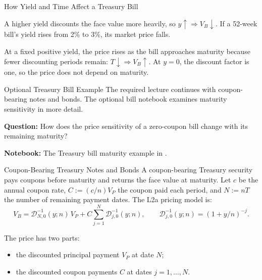 \documentclass[aspectratio=169,11pt]{beamer}
\begin{document}
\begin{frame}{How Yield and Time Affect a Treasury Bill}
  \vspace{0.4em}
  {\large\textbf{}}
  \vspace{0.2em}

  A higher yield discounts the face value more heavily, so
  $y\uparrow \Rightarrow V_B\downarrow$. If a 52-week bill's yield rises from
  2\% to 3\%, its market price falls.

  \vspace{0.9em}
  {\large\textbf{}}
  \vspace{0.2em}

  At a fixed positive yield, the price rises as the bill approaches maturity
  because fewer discounting periods remain: $T\downarrow \Rightarrow
  V_B\uparrow$. At $y=0$, the discount factor is one, so the price does not
  depend on maturity.

\end{frame}

\begin{frame}{Optional Treasury Bill Example}
  \vspace{0.6em}
  The required lecture continues with coupon-bearing notes and bonds. The
  optional bill notebook examines maturity sensitivity in more detail.

  \vspace{1.0em}
  {\normalsize\textbf{Question:} How does the price sensitivity of a zero-coupon
  bill change with its remaining maturity?}

  \vspace{1.0em}
  {\normalsize\textbf{Notebook:} The Treasury bill maturity example in
  .}
\end{frame}

\begin{frame}{Coupon-Bearing Treasury Notes and Bonds}
  \vspace{0.1em}
  A coupon-bearing Treasury security pays coupons before maturity and returns
  the face value at maturity. Let $c$ be the annual coupon rate,
  $C:=(c/n)V_P$ the coupon paid each period, and $N:=nT$ the number of remaining
  payment dates. The L2a pricing model is:
  \[
    V_B=\mathcal D_{N,0}^{-1}(y;n)\,V_P+C\sum_{j=1}^{N}\mathcal D_{j,0}^{-1}(y;n),
    \qquad \mathcal D_{j,0}^{-1}(y;n)=\left(1+y/n\right)^{-j}.
  \]

  \vspace{0.5em}
  The price has two parts:
  \begin{itemize}\setlength{\itemsep}{0.4em}
    \item the discounted principal payment $V_P$ at date $N$;
    \item the discounted coupon payments $C$ at dates $j=1,\ldots,N$.
  \end{itemize}
\end{frame}
\end{document}
